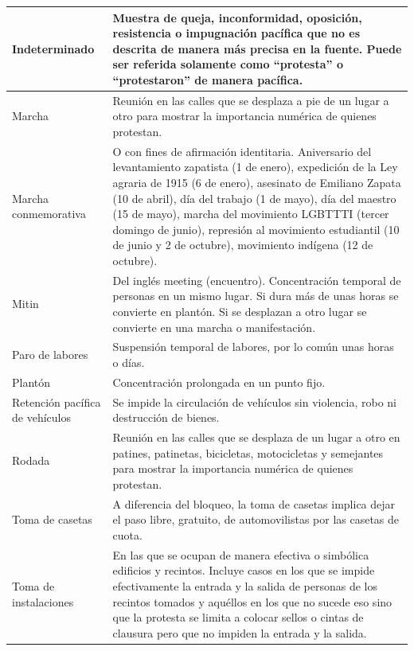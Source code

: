 \documentclass[letterpaper, 11pt]{book}
\theoremstyle{definition}
\theoremstyle{remark}
\begin{document}
{{{{{{{{{{\begin{footnotesize}
\begin{longtable}{|p{3cm}@{ }|p{12cm}@{ }|}
\hline
Indeterminado &  Muestra de queja, inconformidad, oposición, resistencia o impugnación pacífica que no es descrita de manera más precisa en la fuente. Puede ser referida solamente como “protesta” o “protestaron” de manera pacífica.\\
\hline
Marcha &  Reunión en las calles que se desplaza a pie de un lugar a otro para mostrar la importancia numérica de quienes protestan.\\
\hline
Marcha conmemorativa & O con fines de afirmación identitaria. Aniversario del levantamiento zapatista (1 de enero), expedición de la Ley agraria de 1915 (6 de enero), asesinato de Emiliano Zapata (10 de abril), día del trabajo (1 de mayo), día del maestro (15 de mayo), marcha del movimiento LGBTTTI (tercer domingo de junio), represión al movimiento estudiantil (10 de junio y 2 de octubre), movimiento indígena (12 de octubre).\\
\hline
Mitin &  Del inglés meeting (encuentro). Concentración temporal de personas en un mismo lugar. Si dura más de unas horas se convierte en plantón. Si se desplazan a otro lugar se convierte en una marcha o manifestación.\\
\hline
Paro de labores &  Suspensión temporal de labores, por lo común unas horas o días.\\
\hline
Plantón & Concentración prolongada en un punto fijo.\\
\hline
Retención pacífica de vehículos& Se impide la circulación de vehículos sin violencia, robo ni destrucción de bienes.\\
\hline
Rodada &  Reunión en las calles que se desplaza de un lugar a otro en patines, patinetas, bicicletas, motocicletas y semejantes para mostrar la importancia numérica de quienes protestan.\\
\hline
Toma de casetas & A diferencia del bloqueo, la toma de casetas implica dejar el paso libre, gratuito, de automovilistas por las casetas de cuota.\\
\hline
Toma de instalaciones & En las que se ocupan de manera efectiva o simbólica edificios y recintos. Incluye casos en los que se impide efectivamente la entrada y la salida de personas de los recintos tomados y aquéllos en los que no sucede eso sino que la protesta se limita a colocar sellos o cintas de clausura pero que no impiden la entrada y la salida.\\
\hline
\end{longtable}
\end{footnotesize}
\newpage





}}}}}}}}}}
\end{document}
